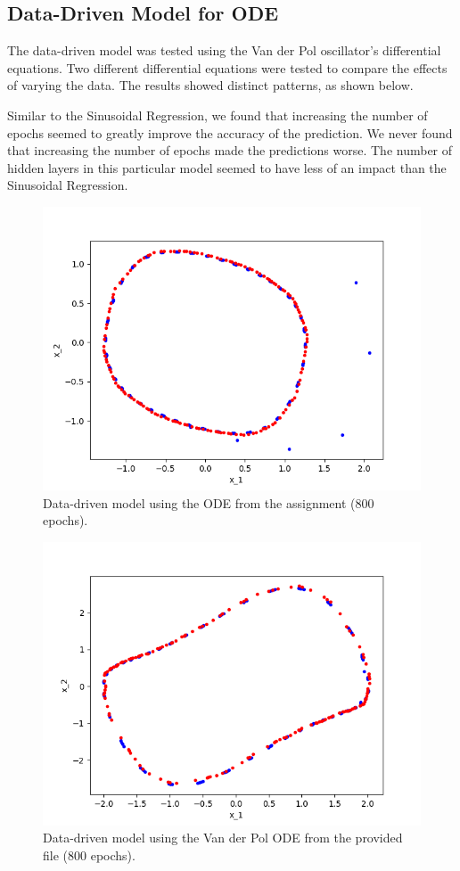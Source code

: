 \documentclass{article}
\begin{document}
\subsection{Data-Driven Model for ODE}
The data-driven model was tested using the Van der Pol oscillator’s differential equations. Two different differential equations were tested to compare the effects of varying the data. The results showed distinct patterns, as shown below.

Similar to the Sinusoidal Regression, we found that increasing the number of epochs seemed to greatly improve the accuracy of the prediction. We never found that increasing the number of epochs made the predictions worse. The number of hidden layers in this particular model seemed to have less of an impact than the Sinusoidal Regression.

\begin{figure}[h!]
    \centering
    \includegraphics[scale=0.4]{figs/Vander_Test01.png}
    \caption{Data-driven model using the ODE from the assignment (800 epochs).}
\end{figure}

\begin{figure}[h!]
    \centering
    \includegraphics[scale=0.4]{figs/Vander_Test02.png}
    \caption{Data-driven model using the Van der Pol ODE from the provided file (800 epochs).}
\end{figure}
\end{document}
